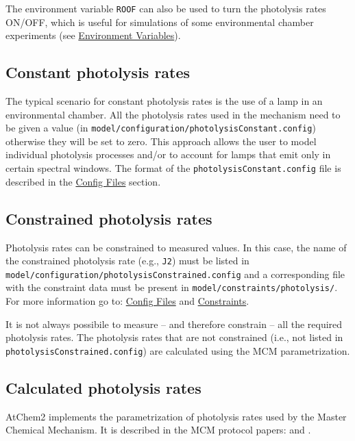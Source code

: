 The environment variable \texttt{ROOF} can also be used to turn the
photolysis rates ON/OFF, which is useful for simulations of some
environmental chamber experiments (see
\hyperref[sec:environment-variables]{Environment Variables}).

\subsection{Constant photolysis rates} \label{subsec:constant-photolysis-rates}

The typical scenario for constant photolysis rates is the use of a
lamp in an environmental chamber. All the photolysis rates used in the
mechanism need to be given a value (in
\texttt{model/configuration/photolysisConstant.config}) otherwise they
will be set to zero. This approach allows the user to model individual
photolysis processes and/or to account for lamps that emit only in
certain spectral windows. The format of the
\texttt{photolysisConstant.config} file is described in the
\hyperref[sec:config-files]{Config Files} section.

\subsection{Constrained photolysis rates} \label{subsec:constrained-photolysis-rates}

Photolysis rates can be constrained to measured values. In this case,
the name of the constrained photolysis rate (e.g., \texttt{J2}) must
be listed in\\
\texttt{model/configuration/photolysisConstrained.config} and a
corresponding file with the constraint data must be present in
\texttt{model/constraints/photolysis/}. For more information go to:
\hyperref[sec:config-files]{Config Files} and
\hyperref[sec:constraints]{Constraints}.

It is not always possibile to measure -- and therefore constrain --
all the required photolysis rates. The photolysis rates that are not
constrained (i.e., not listed in
\texttt{photolysisConstrained.config}) are calculated using the MCM
parametrization.

\subsection{Calculated photolysis rates} \label{subsec:calculated-photolysis-rates}

AtChem2 implements the parametrization of photolysis rates used by the
Master Chemical Mechanism. It is described in the MCM protocol papers:
\citep{Jenkin_1997} and \citep{Saunders_2003}.

